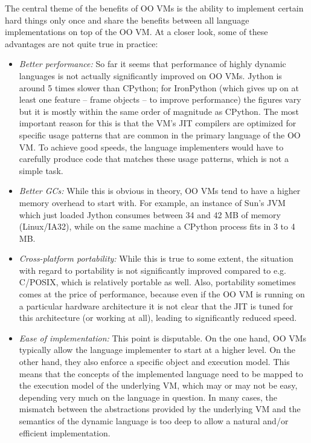 \documentclass{llncs}
\begin{document}
\noindent
The central theme of the benefits of OO VMs is the ability to
implement certain hard things only once and share the benefits between
all language implementations on top of the OO VM.  At a closer look,
some of these advantages are not quite true in practice:

\begin{itemize}
\item
\emph{Better performance:} So far it seems that performance of highly dynamic
languages is not actually significantly improved on OO VMs. 
Jython is around 5
times slower than CPython; for IronPython (which
gives up on at least one feature -- frame objects -- to improve performance)
the figures vary but it is mostly
within the same order of magnitude as CPython. The most important reason for
this is that the VM's JIT compilers are optimized for specific usage patterns
that are common in the primary language of the OO VM. To achieve good speeds, the
language implementers would have to carefully produce code that matches these
usage patterns, which is not a simple task.

\item
\emph{Better GCs:} While this is obvious in theory, OO VMs tend to have a
higher memory overhead to start with.  For example, an instance of Sun's
JVM which just loaded Jython consumes between 34 and 42 MB of memory
(Linux/IA32), while on the same machine a CPython process fits in 3 to 4
MB.

\item
\emph{Cross-platform portability:} While this is true to some extent, the
situation with regard to portability is not significantly improved compared to
e.g.  C/POSIX, which is relatively portable as well. Also, portability sometimes
comes at the price of performance, because even if the OO VM is running on a
particular hardware architecture it is not clear that the JIT is tuned for this
architecture (or working at all), leading to significantly reduced
speed.

\item
\emph{Ease of implementation:} This point is disputable. On the one hand, OO
VMs typically allow the language implementer to start at a higher level. On the
other hand, they also enforce a specific object and execution model. This means
that the concepts of the implemented language need to be mapped to the
execution model of the underlying VM, which may or may not be easy, depending very
much on the language in question.  In many cases, the mismatch between
the abstractions provided by the underlying VM and the semantics of the
dynamic language is too deep to allow a natural and/or efficient
implementation.


\end{itemize}
\end{document}
